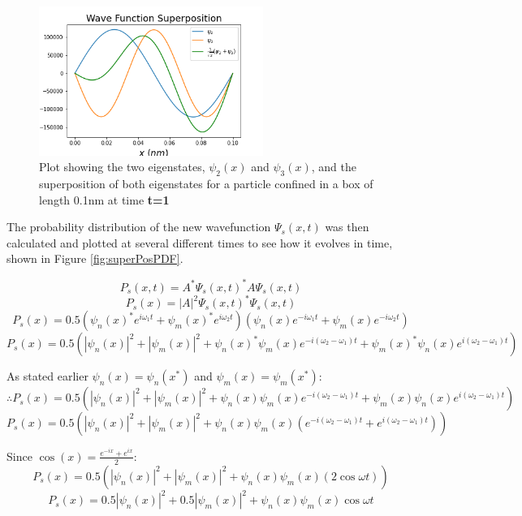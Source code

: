 \begin{figure}[h]
    \centering
    \includegraphics[width=0.65\textwidth]{lab1/images/superpositionWave.png}
    \caption{Plot showing the two eigenstates, $\psi_2 (x)$ and $\psi_3 (x)$, and the superposition of both eigenstates for a particle confined in a box of length 0.1nm at time \textbf{t=1}}
    \label{fig:superPosWave}
\end{figure}

The probability distribution of the new wavefunction $\Psi_s(x,t)$ was then calculated and plotted at several different times to see how it evolves in time, shown in Figure \ref{fig:superPosPDF}.

$$P_s(x, t) = A^{*} \Psi_s (x, t)^{*} A\Psi_s (x, t)$$
$$P_s(x) = \left | A \right |^2 \Psi_s (x,t)^{*} \Psi_s (x,t)$$
$$P_s(x) = 0.5 (\psi_n (x)^{*}e^{i \omega_{1} t} + \psi_m (x)^{*}e^{i \omega_{2} t}) (\psi_n (x)e^{-i \omega_{1} t} + \psi_m (x)e^{-i \omega_{2} t})$$
$$P_s(x) = 0.5 (\left | \psi_n (x) \right |^2 + \left | \psi_m (x) \right |^2 + \psi_n (x)^{*}\psi_m (x)e^{-i(\omega_{2}- \omega_{1}) t} + \psi_m (x)^{*}\psi_n (x)e^{i(\omega_{2}- \omega_{1}) t})$$

As stated earlier $\psi_n (x)=\psi_n (x^{*})$ and $\psi_m (x)=\psi_m (x^{*})$:
$$\therefore P_s(x) =  0.5 (\left | \psi_n (x) \right |^2 + \left | \psi_m (x) \right |^2 + \psi_n (x)\psi_m (x)e^{-i(\omega_{2}- \omega_{1}) t} + \psi_m (x)\psi_n (x)e^{i(\omega_{2}- \omega_{1}) t})$$
$$P_s(x) = 0.5 (\left | \psi_n (x) \right |^2 + \left | \psi_m (x) \right |^2 + \psi_n (x)\psi_m (x)(e^{-i(\omega_{2}- \omega_{1}) t} + e^{i(\omega_{2}- \omega_{1}) t}))$$

Since $\cos(x)=\frac{e^{-ix}+e^{ix}}{2}$:
$$P_s(x) = 0.5 (\left | \psi_n (x) \right |^2 + \left | \psi_m (x) \right |^2 + \psi_n (x)\psi_m (x)(2\cos\omega t))$$
$$P_s(x) = 0.5 \left | \psi_n (x) \right |^2 + 0.5\left | \psi_m (x) \right |^2 + \psi_n (x)\psi_m (x)\cos\omega t$$

